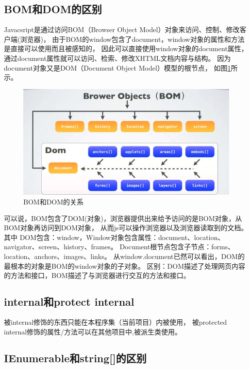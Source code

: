 \documentclass{book}
\begin{document}
\subsection{BOM和DOM的区别}

Javacsript是通过访问BOM（Browser Object Model）对象来访问、控制、修改客户端(浏览器)，
由于BOM的window包含了document，window对象的属性和方法是直接可以使用而且被感知的，
因此可以直接使用window对象的document属性，通过document属性就可以访问、检索、修改XHTML文档内容与结构。
因为document对象又是DOM（Document Object Model）模型的根节点，
如图\ref{figure:TheRelationshipOfDOMAndPOM}所示。

\begin{figure}[htbp]
	\centering
	\includegraphics[scale=0.5]{TheRelationshipOfDOMAndPOM.jpg}
	\caption{BOM和DOM的关系}
	\label{figure:TheRelationshipOfDOMAndPOM}
\end{figure}

可以说，BOM包含了DOM(对象)，浏览器提供出来给予访问的是BOM对象，从BOM对象再访问到DOM对象，
从而js可以操作浏览器以及浏览器读取到的文档。其中
DOM包含：window，Window对象包含属性：document、location、navigator、screen、history、frames。
Document根节点包含子节点：forms、location、anchors、images、links。
从window.document已然可以看出，DOM的最根本的对象是BOM的window对象的子对象。
区别：DOM描述了处理网页内容的方法和接口，BOM描述了与浏览器进行交互的方法和接口。

\subsection{internal和protect internal}

被internal修饰的东西只能在本程序集（当前项目）内被使用，
被protected internal修饰的属性/方法可以在其他项目中,被派生类使用。

\subsection{IEnumerable和string[]的区别}
\end{document}
